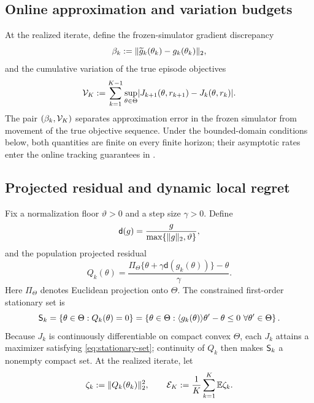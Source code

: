 \subsection{Online approximation and variation budgets}

At the realized iterate, define the frozen-simulator gradient discrepancy
\begin{equation}\label{eq:simulator-gradient-error}
 \beta_k
 :=\lVert\widetilde g_k(\theta_k)-g_k(\theta_k)\rVert_2,
\end{equation}
and the cumulative variation of the true episode objectives
\begin{equation}\label{eq:objective-variation}
 \mathcal V_K
 :=\sum_{k=1}^{K-1}
 \sup_{\theta\in\Theta}
 \lvert J_{k+1}(\theta,r_{k+1})-J_k(\theta,r_k)\rvert.
\end{equation}
The pair $(\beta_k,\mathcal V_K)$ separates approximation error in the frozen simulator from movement of the true objective sequence.  Under the bounded-domain conditions below, both quantities are finite on every finite horizon; their asymptotic rates enter the online tracking guarantees in .

\subsection{Projected residual and dynamic local regret}

Fix a normalization floor $\vartheta>0$ and a step size $\gamma>0$.  Define
\begin{equation}\label{eq:normalized-direction}
 \mathsf d(g)=\frac{g}{\max\{\lVert g\rVert_2,\vartheta\}},
\end{equation}
and the population projected residual
\begin{equation}\label{eq:projected-residual}
 Q_k(\theta)
 =\frac{\Pi_\Theta\{\theta+\gamma\mathsf d(g_k(\theta))\}-\theta}{\gamma}.
\end{equation}
Here $\Pi_\Theta$ denotes Euclidean projection onto $\Theta$.  The constrained first-order stationary set is
\begin{equation}\label{eq:stationary-set}
 \mathsf S_k
 =\{\theta\in\Theta:Q_k(\theta)=0\}
 =\left\{\theta\in\Theta:
 \langle g_k(\theta)\rangle{\theta'-\theta}\le0\ \forall \theta'\in\Theta\right\}.
\end{equation}
Because $J_k$ is continuously differentiable on compact convex $\Theta$, each $J_k$ attains a maximizer satisfying \eqref{eq:stationary-set}; continuity of $Q_k$ then makes $\mathsf S_k$ a nonempty compact set.  At the realized iterate, let
\begin{equation}\label{eq:periodwise-residual}
 \zeta_k:=\lVert Q_k(\theta_k)\rVert_2^2,
 \qquad
 \mathcal E_K:=\frac1K\sum_{k=1}^{K}\mathbb E\zeta_k.
\end{equation}

